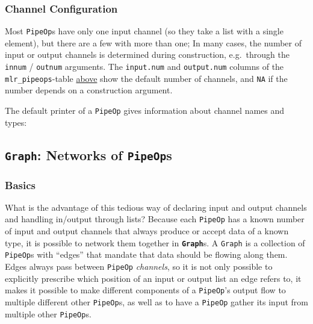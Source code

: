 \documentclass[]{scrbook}
\newenvironment{Shaded}{\begin{snugshade}}{\end{snugshade}}
\newcommand{\NormalTok}[1]{#1}
\renewenvironment{Shaded} {\begin{snugshade}\small} {\end{snugshade}}
\begin{document}
\hypertarget{channel-configuration}{%
\subsubsection{Channel Configuration}\label{channel-configuration}}

Most \texttt{PipeOp}s have only one input channel (so they take a list with a single element), but there are a few with more than one;
In many cases, the number of input or output channels is determined during construction, e.g.~through the \texttt{innum} / \texttt{outnum} arguments.
The \texttt{input.num} and \texttt{output.num} columns of the \texttt{mlr\_pipeops}-table \protect\hyperlink{where-to-get-pipeops}{above} show the default number of channels, and \texttt{NA} if the number depends on a construction argument.

The default printer of a \texttt{PipeOp} gives information about channel names and types:

\begin{Shaded}
\end{Shaded}

\hypertarget{graph-networks-of-pipeops}{%
\subsection{\texorpdfstring{\texttt{Graph}: Networks of \texttt{PipeOp}s}{Graph: Networks of PipeOps}}\label{graph-networks-of-pipeops}}

\hypertarget{basics}{%
\subsubsection{Basics}\label{basics}}

What is the advantage of this tedious way of declaring input and output channels and handling in/output through lists?
Because each \texttt{PipeOp} has a known number of input and output channels that always produce or accept data of a known type, it is possible to network them together in \textbf{\texttt{Graph}}s.
A \texttt{Graph} is a collection of \texttt{PipeOp}s with ``edges'' that mandate that data should be flowing along them.
Edges always pass between \texttt{PipeOp} \emph{channels}, so it is not only possible to explicitly prescribe which position of an input or output list an edge refers to, it makes it possible to make different components of a \texttt{PipeOp}'s output flow to multiple different other \texttt{PipeOp}s, as well as to have a \texttt{PipeOp} gather its input from multiple other \texttt{PipeOp}s.
\end{document}
